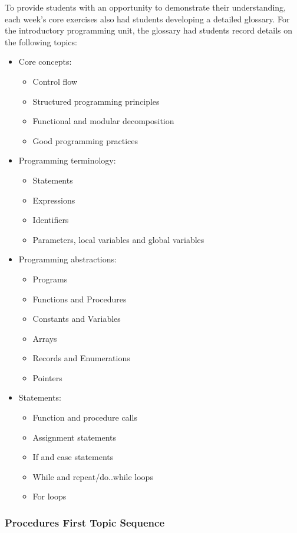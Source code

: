 To provide students with an opportunity to demonstrate their understanding, each week's core exercises also had students developing a detailed glossary. For the introductory programming unit, the glossary had students record details on the following topics:
\begin{itemize}[noitemsep, nolistsep]
	\item Core concepts:
	\begin{itemize}[noitemsep, nolistsep]
		\item Control flow
		\item Structured programming principles
		\item Functional and modular decomposition
		\item Good programming practices
	\end{itemize}
	\item Programming terminology:
	\begin{itemize}[noitemsep, nolistsep]
		\item Statements
		\item Expressions
		\item Identifiers
		\item Parameters, local variables and global variables
	\end{itemize}
	\item Programming abstractions:
	\begin{itemize}[noitemsep, nolistsep]
		\item Programs
		\item Functions and Procedures
		\item Constants and Variables
		\item Arrays
		\item Records and Enumerations
		\item Pointers
	\end{itemize}
	\item Statements:
	\begin{itemize}[noitemsep, nolistsep]
		\item Function and procedure calls
		\item Assignment statements
		\item If and case statements
		\item While and repeat/do..while loops
		\item For loops
	\end{itemize}
\end{itemize}

\subsubsection{Procedures First Topic Sequence} %
\label{ssub:procedures_first_topic_sequence}

